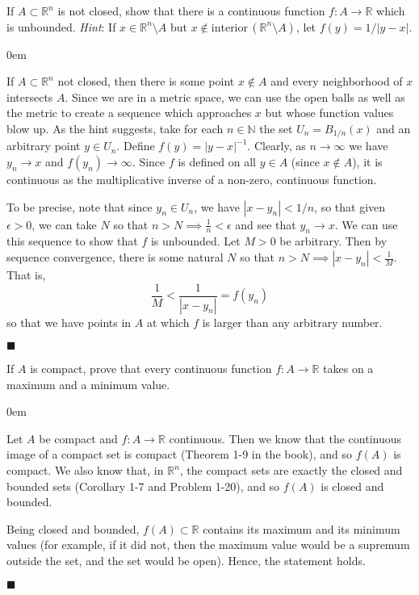 \documentclass[12pt]{article}
\renewcommand{\qed}{\hfill$\blacksquare$}
\renewenvironment{proof}{\begin{addmargin}[1em]{0em}\begin{newproof}}{\end{newproof}\end{addmargin}\qed}
\newenvironment{problem}[2][Problem]{\begin{trivlist}
\item[\hskip \labelsep {\bfseries #1}\hskip \labelsep {\bfseries #2.}]}{\end{trivlist}}
\begin{document}
\begin{problem}{1-28}
If $A\subset \mathbb{R}^n$ is not closed, show that there is a continuous function $f:A\rightarrow \mathbb{R}$ which is unbounded. \textit{Hint}: If $x\in \mathbb{R}^n \setminus A$ but $x\notin \text{interior}\, \left(\mathbb{R}^n \setminus A\right)$, let $f\left(y\right) = 1/\left|y-x\right|$.
\end{problem}
\begin{proof}
If $A\subset \mathbb{R}^n$ not closed, then there is some point $x \notin A$ and every neighborhood of $x$ intersects $A$. Since we are in a metric space, we can use the open balls as well as the metric to create a sequence which approaches $x$ but whose function values blow up. As the hint suggests, take for each $n \in \mathbb{N}$ the set $U_n = B_{1/n}\left(x\right)$ and an arbitrary point $y \in U_n$. Define $f\left(y\right) = \left|y-x\right|^{-1}$. Clearly, as $n\rightarrow \infty$ we have $y_n \rightarrow x$ and $f\left(y_n\right) \rightarrow \infty$. Since $f$ is defined on all $y \in A$ (since $x\notin A$), it is continuous as the multiplicative inverse of a non-zero, continuous function.

To be precise, note that since $y_n \in U_n$, we have $\left|x-y_n\right| < 1/n$, so that given $\epsilon > 0$, we can take $N$ so that $ n > N \implies \frac{1}{n} < \epsilon$ and see that $y_n \rightarrow x$. We can use this sequence to show that $f$ is unbounded. Let $M>0$ be arbitrary. Then by sequence convergence, there is some natural $N$ so that $ n>N \implies \left|x-y_n\right| < \frac{1}{M}$. That is, $$ \frac{1}{M} < \frac{1}{\left|x-y_n\right|} = f\left(y_n\right) $$ so that we have points in $A$ at which $f$ is larger than any arbitrary number.
\end{proof}
 
 
 
 
 
 
 

\begin{problem}{1.29}
If $A$ is compact, prove that every continuous function $f:A\rightarrow \mathbb{R}$ takes on a maximum and a minimum value.
\end{problem}

\begin{proof}
Let $A$ be compact and $f:A\rightarrow \mathbb{R}$ continuous. Then we know that the continuous image of a compact set is compact (Theorem 1-9 in the book), and so $f\left(A\right)$ is compact. We also know that, in $\mathbb{R}^n$, the compact sets are exactly the closed and bounded sets (Corollary 1-7 and Problem 1-20), and so $f\left(A\right)$ is closed and bounded.

Being closed and bounded, $f\left(A\right) \subset \mathbb{R}$ contains its maximum and its minimum values (for example, if it did not, then the maximum value would be a supremum outside the set, and the set would be open). Hence, the statement holds.
\end{proof}
\end{document}
